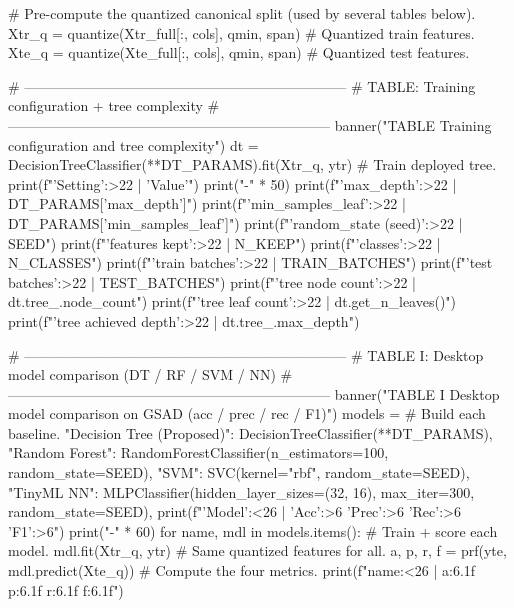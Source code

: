     # Pre-compute the quantized canonical split (used by several tables below).
    Xtr_q = quantize(Xtr_full[:, cols], qmin, span)   # Quantized train features.
    Xte_q = quantize(Xte_full[:, cols], qmin, span)   # Quantized test features.

    # ---------------------------------------------------------------------
    # TABLE: Training configuration + tree complexity
    # ---------------------------------------------------------------------
    banner("TABLE  Training configuration and tree complexity")
    dt = DecisionTreeClassifier(**DT_PARAMS).fit(Xtr_q, ytr)  # Train deployed tree.
    print(f"{'Setting':>22} | {'Value'}")
    print("-" * 50)
    print(f"{'max_depth':>22} | {DT_PARAMS['max_depth']}")
    print(f"{'min_samples_leaf':>22} | {DT_PARAMS['min_samples_leaf']}")
    print(f"{'random_state (seed)':>22} | {SEED}")
    print(f"{'features kept':>22} | {N_KEEP}")
    print(f"{'classes':>22} | {N_CLASSES}")
    print(f"{'train batches':>22} | {TRAIN_BATCHES}")
    print(f"{'test batches':>22} | {TEST_BATCHES}")
    print(f"{'tree node count':>22} | {dt.tree_.node_count}")
    print(f"{'tree leaf count':>22} | {dt.get_n_leaves()}")
    print(f"{'tree achieved depth':>22} | {dt.tree_.max_depth}")

    # ---------------------------------------------------------------------
    # TABLE I: Desktop model comparison  (DT / RF / SVM / NN)
    # ---------------------------------------------------------------------
    banner("TABLE I  Desktop model comparison on GSAD (acc / prec / rec / F1)")
    models = {                                         # Build each baseline.
        "Decision Tree (Proposed)": DecisionTreeClassifier(**DT_PARAMS),
        "Random Forest": RandomForestClassifier(n_estimators=100, random_state=SEED),
        "SVM": SVC(kernel="rbf", random_state=SEED),
        "TinyML NN": MLPClassifier(hidden_layer_sizes=(32, 16),
                                   max_iter=300, random_state=SEED),
    }
    print(f"{'Model':<26} | {'Acc':>6} {'Prec':>6} {'Rec':>6} {'F1':>6}")
    print("-" * 60)
    for name, mdl in models.items():                   # Train + score each model.
        mdl.fit(Xtr_q, ytr)                            # Same quantized features for all.
        a, p, r, f = prf(yte, mdl.predict(Xte_q))      # Compute the four metrics.
        print(f"{name:<26} | {a:6.1f} {p:6.1f} {r:6.1f} {f:6.1f}")

